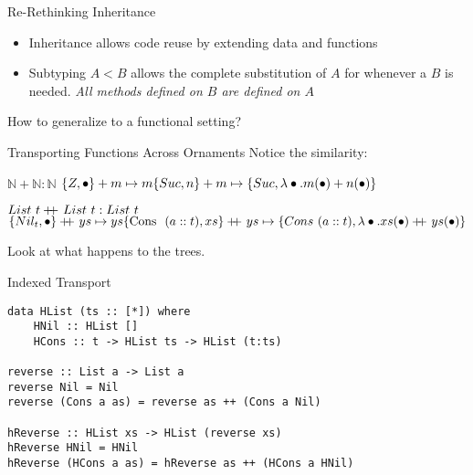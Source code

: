 \documentclass{beamer}
\newcommand{\NN}{\mathbb{N}}
\newcommand{\Cons}{\mbox{Cons }}
\newcommand\doubleplus{+\kern-1.3ex+\kern0.8ex}
\begin{document}
\begin{frame}[fragile]{Re-Rethinking Inheritance}
\begin{itemize}
\item Inheritance allows code reuse by extending data and functions
\item Subtyping $A < B$ allows the complete substitution of $A$ for whenever a $B$ is needed. \emph{All methods defined on $B$ are defined on $A$}
\end{itemize}
\pause
\begin{center}
\Large How to generalize to a functional setting?
\end{center}
\end{frame}
\begin{frame}{Transporting Functions Across Ornaments}
Notice the similarity:
\begin{block}{$\NN + \NN : \NN$}
$\{Z,\bullet\} + m \mapsto m\\
\{Suc, n\} + m \mapsto \{Suc,\lambda \bullet.m(\bullet) + n(\bullet)\}$
\end{block}
\begin{block}{$List~t \doubleplus List~t : List~t$}
$\{Nil_t,\bullet\} \doubleplus ys \mapsto ys\\
\{\Cons~(a :: t), xs\} \doubleplus ys \mapsto \{Cons~(a :: t),\lambda \bullet.xs(\bullet) \doubleplus ys(\bullet)\}$
\end{block}
\pause
Look at what happens to the trees.
\end{frame}

\begin{frame}[fragile]{Indexed Transport}
\begin{lstlisting}
data HList (ts :: [*]) where
    HNil :: HList []
    HCons :: t -> HList ts -> HList (t:ts)

reverse :: List a -> List a
reverse Nil = Nil
reverse (Cons a as) = reverse as ++ (Cons a Nil) 

hReverse :: HList xs -> HList (reverse xs)
hReverse HNil = HNil
hReverse (HCons a as) = hReverse as ++ (HCons a HNil)

\end{lstlisting}

\end{frame}
\end{document}
